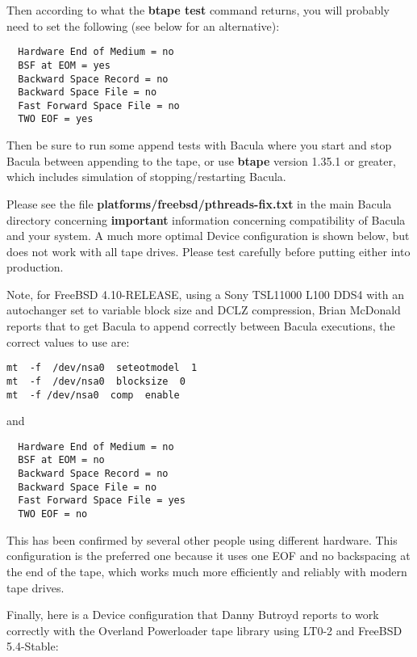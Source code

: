 Then according to what the {\bf btape test} command returns, you will probably
need to set the following (see below for an alternative):

\footnotesize
\begin{verbatim}
  Hardware End of Medium = no
  BSF at EOM = yes
  Backward Space Record = no
  Backward Space File = no
  Fast Forward Space File = no
  TWO EOF = yes
\end{verbatim}
\normalsize

Then be sure to run some append tests with Bacula where you start and stop
Bacula between appending to the tape, or use {\bf btape} version 1.35.1 or
greater, which includes simulation of stopping/restarting Bacula.

Please see the file {\bf platforms/freebsd/pthreads-fix.txt} in the main
Bacula directory concerning {\bf important} information concerning
compatibility of Bacula and your system. A much more optimal Device
configuration is shown below, but does not work with all tape drives. Please
test carefully before putting either into production.

Note, for FreeBSD 4.10-RELEASE, using a Sony TSL11000 L100 DDS4 with an
autochanger set to variable block size and DCLZ compression, Brian McDonald
reports that to get Bacula to append correctly between Bacula executions,
the correct values to use are:

\footnotesize
\begin{verbatim}
mt  -f  /dev/nsa0  seteotmodel  1
mt  -f  /dev/nsa0  blocksize  0
mt  -f /dev/nsa0  comp  enable
\end{verbatim}
\normalsize

and

\footnotesize
\begin{verbatim}
  Hardware End of Medium = no
  BSF at EOM = no
  Backward Space Record = no
  Backward Space File = no
  Fast Forward Space File = yes
  TWO EOF = no
\end{verbatim}
\normalsize

This has been confirmed by several other people using different hardware. This
configuration is the preferred one because it uses one EOF and no backspacing
at the end of the tape, which works much more efficiently and reliably with
modern tape drives.

Finally, here is a Device configuration that Danny Butroyd reports to work
correctly with the Overland Powerloader tape library using LT0-2 and
FreeBSD 5.4-Stable:


